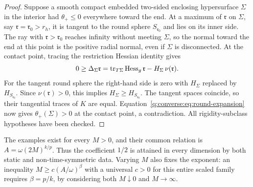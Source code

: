 \begin{proof}
Suppose a smooth compact embedded two-sided enclosing hypersurface
$\Sigma$ in the interior had $\theta_+\le0$ everywhere toward the
end.  At a maximum of $\mathfrak r$ on $\Sigma$, say
$\mathfrak r=\mathfrak r_0>r_h$, it is tangent to the round sphere
$S_{\mathfrak r_0}$ and lies on its inner side.  The ray with
$\mathfrak r>\mathfrak r_0$ reaches infinity without meeting
$\Sigma$, so the normal toward the end at this point is the positive
radial normal, even if $\Sigma$ is disconnected.  At the contact
point, tracing the restriction Hessian identity gives
\[
 0\ge\Delta_\Sigma\mathfrak r
  =\operatorname{tr}_{T\Sigma}\operatorname{Hess}_g\mathfrak r
            -H_\Sigma\,\nu(\mathfrak r).
\]
For the tangent round sphere the right-hand side is zero with
$H_\Sigma$ replaced by $H_{S_{\mathfrak r_0}}$.
Since $\nu(\mathfrak r)>0$, this implies
$H_\Sigma\ge H_{S_{\mathfrak r_0}}$.
The tangent spaces coincide, so their tangential traces of $K$ are
equal.  Equation~\eqref{q:converse:eq:round-expansion} now gives
$\theta_+(\Sigma)>0$ at the contact point, a contradiction.
All rigidity-subclass hypotheses have been checked.
\end{proof}

The examples exist for every $M>0$, and their common relation is
$A=\omega(2M)^{k/p}$.  Thus the coefficient $1/2$ is attained in every
dimension by both static and non-time-symmetric data.  Varying $M$
also fixes the exponent: an inequality
$M\ge c(A/\omega)^\beta$ with a universal $c>0$ for this entire scaled
family requires $\beta=p/k$, by considering both $M\downarrow0$ and
$M\to\infty$.
